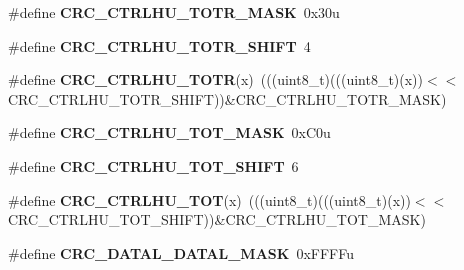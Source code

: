 \begin{DoxyCompactItemize}
\item 
\#define {\bfseries C\+R\+C\+\_\+\+C\+T\+R\+L\+H\+U\+\_\+\+T\+O\+T\+R\+\_\+\+M\+A\+SK}~0x30u\hypertarget{group__CRC__Register__Masks_ga0418249380c6e69fc9a949f8da4e60f1}{}\label{group__CRC__Register__Masks_ga0418249380c6e69fc9a949f8da4e60f1}

\item 
\#define {\bfseries C\+R\+C\+\_\+\+C\+T\+R\+L\+H\+U\+\_\+\+T\+O\+T\+R\+\_\+\+S\+H\+I\+FT}~4\hypertarget{group__CRC__Register__Masks_ga991fefda83335d188d0cc82f1e64f43e}{}\label{group__CRC__Register__Masks_ga991fefda83335d188d0cc82f1e64f43e}

\item 
\#define {\bfseries C\+R\+C\+\_\+\+C\+T\+R\+L\+H\+U\+\_\+\+T\+O\+TR}(x)~(((uint8\+\_\+t)(((uint8\+\_\+t)(x))$<$$<$C\+R\+C\+\_\+\+C\+T\+R\+L\+H\+U\+\_\+\+T\+O\+T\+R\+\_\+\+S\+H\+I\+FT))\&C\+R\+C\+\_\+\+C\+T\+R\+L\+H\+U\+\_\+\+T\+O\+T\+R\+\_\+\+M\+A\+SK)\hypertarget{group__CRC__Register__Masks_ga93d5a2251369091d34c8cca12d716c2b}{}\label{group__CRC__Register__Masks_ga93d5a2251369091d34c8cca12d716c2b}

\item 
\#define {\bfseries C\+R\+C\+\_\+\+C\+T\+R\+L\+H\+U\+\_\+\+T\+O\+T\+\_\+\+M\+A\+SK}~0x\+C0u\hypertarget{group__CRC__Register__Masks_gac2999b1c162cd0860f76f002ead704ad}{}\label{group__CRC__Register__Masks_gac2999b1c162cd0860f76f002ead704ad}

\item 
\#define {\bfseries C\+R\+C\+\_\+\+C\+T\+R\+L\+H\+U\+\_\+\+T\+O\+T\+\_\+\+S\+H\+I\+FT}~6\hypertarget{group__CRC__Register__Masks_ga079a05fc69d357e3fadfb07de8abbeee}{}\label{group__CRC__Register__Masks_ga079a05fc69d357e3fadfb07de8abbeee}

\item 
\#define {\bfseries C\+R\+C\+\_\+\+C\+T\+R\+L\+H\+U\+\_\+\+T\+OT}(x)~(((uint8\+\_\+t)(((uint8\+\_\+t)(x))$<$$<$C\+R\+C\+\_\+\+C\+T\+R\+L\+H\+U\+\_\+\+T\+O\+T\+\_\+\+S\+H\+I\+FT))\&C\+R\+C\+\_\+\+C\+T\+R\+L\+H\+U\+\_\+\+T\+O\+T\+\_\+\+M\+A\+SK)\hypertarget{group__CRC__Register__Masks_ga190812e0be1bc09b3f29bf3c139140ad}{}\label{group__CRC__Register__Masks_ga190812e0be1bc09b3f29bf3c139140ad}

\item 
\#define {\bfseries C\+R\+C\+\_\+\+D\+A\+T\+A\+L\+\_\+\+D\+A\+T\+A\+L\+\_\+\+M\+A\+SK}~0x\+F\+F\+F\+Fu\hypertarget{group__CRC__Register__Masks_ga8bad59d8f638bc49c5c098b0be9beb23}{}\label{group__CRC__Register__Masks_ga8bad59d8f638bc49c5c098b0be9beb23}


\end{DoxyCompactItemize}
